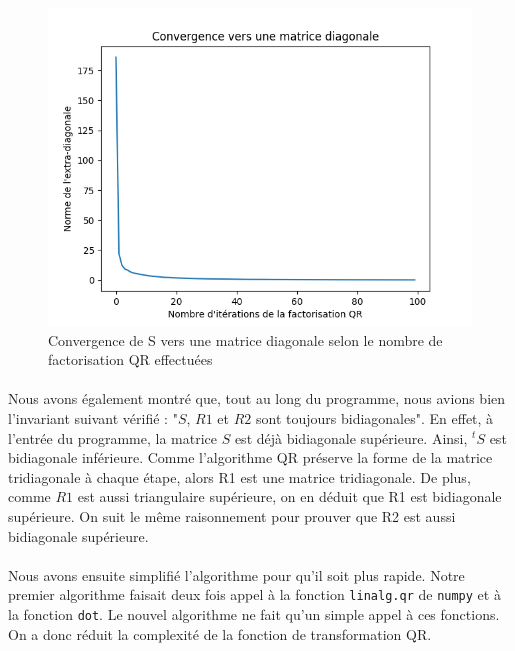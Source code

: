 \documentclass{article}
\begin{document}
\begin{figure}[H]
    \centering
    \includegraphics[scale=0.7]{convergence_facto_QR.png}
    \caption{Convergence de S vers une matrice diagonale selon le nombre de factorisation QR effectuées}
    \label{fig:facto_QR}
\end{figure}

\paragraph{}
Nous avons également montré que, tout au long du programme, nous avions bien l'invariant suivant vérifié : "$S$, $R1$ et $R2$ sont toujours bidiagonales".
En effet, à l'entrée du programme, la matrice $S$ est déjà bidiagonale supérieure.
Ainsi, $^tS$ est bidiagonale inférieure.
Comme l'algorithme QR préserve la forme de la matrice tridiagonale à chaque étape, alors R1 est une matrice tridiagonale. De plus, comme $R1$ est aussi triangulaire supérieure, on en déduit que R1 est bidiagonale supérieure. On suit le même raisonnement pour prouver que R2 est aussi bidiagonale supérieure.

\paragraph{}
Nous avons ensuite simplifié l'algorithme pour qu'il soit plus rapide. Notre premier algorithme faisait deux fois appel à la fonction \verb|linalg.qr| de \verb|numpy| et à la fonction \verb|dot|. Le nouvel algorithme ne fait qu'un simple appel à ces fonctions. On a donc réduit la complexité de la fonction de transformation QR.
\end{document}
